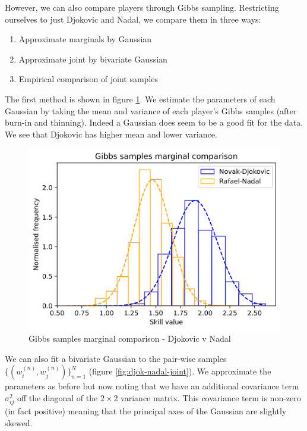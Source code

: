 \documentclass[]{article}
\newcommand{\figwidth}{0.6\linewidth}
\begin{document}
However, we can also compare players through Gibbs sampling. Restricting ourselves to just Djokovic and Nadal, we compare them in three ways:

\begin{enumerate}
	\item Approximate marginals by Gaussian
	\item Approximate joint by bivariate Gaussian
	\item Empirical comparison of joint samples
\end{enumerate}

The first method is shown in figure \ref{fig:djok-nadal-marginal}. We estimate the parameters of each Gaussian by taking the mean and variance of each player's Gibbs samples (after burn-in and thinning). Indeed a Gaussian does seem to be a good fit for the data. We see that Djokovic has higher mean and lower variance.

\begin{figure}[!h]
	\centering
	\includegraphics[width=\figwidth]{djokovic-nadal-marginal.png}
	\caption{Gibbs samples marginal comparison - Djokovic v Nadal}
	\label{fig:djok-nadal-marginal}
\end{figure}

We can also fit a bivariate Gaussian to the pair-wise samples $\{(w_i^{(n)}, w_j^{(n)})\}_{n=1}^{N}$ (figure \ref{fig:djok-nadal-joint}). We approximate the parameters as before but now noting that we have an additional covariance term $\sigma_{ij}^2$ off the diagonal of the $2 \times 2$ variance matrix. This covariance term is non-zero (in fact positive) meaning that the principal axes of the Gaussian are slightly skewed.
\end{document}
